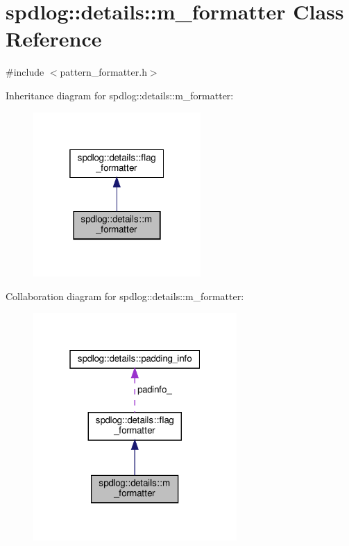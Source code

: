 \hypertarget{classspdlog_1_1details_1_1m__formatter}{}\section{spdlog\+:\+:details\+:\+:m\+\_\+formatter Class Reference}
\label{classspdlog_1_1details_1_1m__formatter}


{\ttfamily \#include $<$pattern\+\_\+formatter.\+h$>$}



Inheritance diagram for spdlog\+:\+:details\+:\+:m\+\_\+formatter\+:
\nopagebreak
\begin{figure}[H]
\begin{center}
\leavevmode
\includegraphics[width=181pt]{classspdlog_1_1details_1_1m__formatter__inherit__graph}
\end{center}
\end{figure}


Collaboration diagram for spdlog\+:\+:details\+:\+:m\+\_\+formatter\+:
\nopagebreak
\begin{figure}[H]
\begin{center}
\leavevmode
\includegraphics[width=220pt]{classspdlog_1_1details_1_1m__formatter__coll__graph}
\end{center}
\end{figure}

